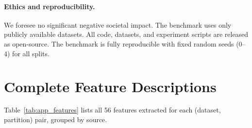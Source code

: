 \documentclass[10pt]{article} %
\begin{document}
\paragraph{Ethics and reproducibility.}
We foresee no significant negative societal impact. The benchmark uses only publicly available datasets. All code, datasets, and experiment scripts are released as open-source. The benchmark is fully reproducible with fixed random seeds (0--4) for all splits.






\appendix

\section{Complete Feature Descriptions}
\label{app:features}

Table~\ref{tab:app_features} lists all 56 features extracted for each (dataset, partition) pair, grouped by source.
\end{document}
